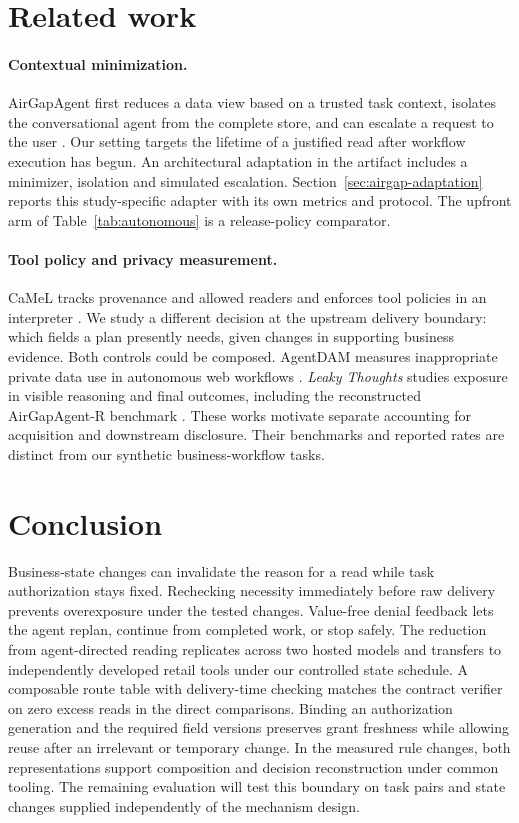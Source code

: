 \documentclass[10pt,twocolumn]{article}
\begin{document}
\section{Related work}
\paragraph{Contextual minimization.}
AirGapAgent first reduces a data view based on a trusted task context, isolates the conversational agent from the complete store, and can escalate a request to the user \cite{airgap}. Our setting targets the lifetime of a justified read after workflow execution has begun. An architectural adaptation in the artifact includes a minimizer, isolation and simulated escalation. Section~\ref{sec:airgap-adaptation} reports this study-specific adapter with its own metrics and protocol. The upfront arm of Table~\ref{tab:autonomous} is a release-policy comparator.

\paragraph{Tool policy and privacy measurement.}
CaMeL tracks provenance and allowed readers and enforces tool policies in an interpreter \cite{camel}. We study a different decision at the upstream delivery boundary: which fields a plan presently needs, given changes in supporting business evidence. Both controls could be composed. AgentDAM measures inappropriate private data use in autonomous web workflows \cite{agentdam}. \emph{Leaky Thoughts} studies exposure in visible reasoning and final outcomes, including the reconstructed AirGapAgent-R benchmark \cite{leaky}. These works motivate separate accounting for acquisition and downstream disclosure. Their benchmarks and reported rates are distinct from our synthetic business-workflow tasks.

\section{Conclusion}
Business-state changes can invalidate the reason for a read while task authorization stays fixed. Rechecking necessity immediately before raw delivery prevents overexposure under the tested changes. Value-free denial feedback lets the agent replan, continue from completed work, or stop safely. The reduction from agent-directed reading replicates across two hosted models and transfers to independently developed retail tools under our controlled state schedule. A composable route table with delivery-time checking matches the contract verifier on zero excess reads in the direct comparisons. Binding an authorization generation and the required field versions preserves grant freshness while allowing reuse after an irrelevant or temporary change. In the measured rule changes, both representations support composition and decision reconstruction under common tooling. The remaining evaluation will test this boundary on task pairs and state changes supplied independently of the mechanism design.
\end{document}
